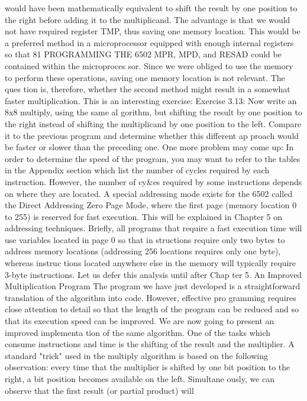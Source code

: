 \documentclass{book}
\begin{document}
would have been mathematically equivalent to shift the result by
one position to the right before adding it to the multiplicand. The
advantage is that we would not have required register TMP, thus
saving one memory location. This would be a preferred method in
a microprocessor equipped with enough internal registers so that
81
PROGRAMMING THE 6502
MPR, MPD, and RESAD could be contained within the microproces
sor. Since we were obliged to use the memory to perform these
operations, saving one memory location is not relevant. The ques
tion is, therefore, whether the second method might result in a
somewhat faster multiplication. This is an interesting exercise:
Exercise 3.13: Now write an 8x8 multiply, using the same al
gorithm, but shifting the result by one position to the right instead of
shifting the multiplicand by one position to the left. Compare it to
the previous program and determine whether this different ap
proach would be faster or slower than the preceding one.
One more problem may come up: In order to determine the
speed of the program, you may want to refer to the tables in the
Appendix section which list the number of cycles required by
each instruction. However, the number of cy&es required by
some instructions depends on where they are located. A special
addressing mode exists for the 6502 called the Direct Addressing
Zero Page Mode, where the first page (memory location 0 to 255)
is reserved for fast execution. This will be explained in Chapter 5
on addressing techniques. Briefly, all programs that require a
fast execution time will use variables located in page 0 so that in
structions require only two bytes to address memory locations
(addressing 256 locations requires only one byte), whereas instruc
tions located anywhere else in the memory will typically require
3-byte instructions. Let us defer this analysis until after Chap
ter 5.
An Improved Multiplication Program
The program we have just developed is a straightforward
translation of the algorithm into code. However, effective pro
gramming requires close attention to detail so that the length of
the program can be reduced and so that its execution speed can be
improved. We are now going to present an improved implementa
tion of the same algorithm.
One of the tasks which consume instructions and time is the
shifting of the result and the multiplier. A standard "trick" used
in the multiply algorithm is based on the following observation:
every time that the multiplier is shifted by one bit position to the
right, a bit position becomes available on the left. Simultane
ously, we can observe that the first result (or partial product) will
\end{document}
